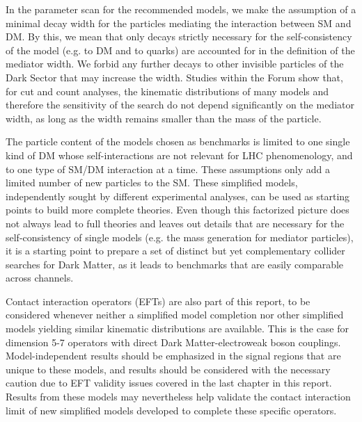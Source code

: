 In the parameter scan for the recommended models, we make the
assumption of a minimal decay width for the particles mediating the
interaction between SM and DM.  By this, we mean that only decays
strictly necessary for the self-consistency of the model (e.g.  to DM
and to quarks) are accounted for in the definition of the mediator
width. We forbid any further decays to other invisible particles of
the Dark Sector that may increase the width. Studies within the Forum
show that, for cut and count analyses, the kinematic distributions of
many models and therefore the sensitivity of the search do not depend
significantly on the mediator width, as long as the width remains smaller
than the mass of the particle.


The particle content of the models chosen as benchmarks is limited to
one single kind of DM whose self-interactions are not relevant for LHC
phenomenology, and to one type of SM/DM interaction at a time. These
assumptions only add a limited number of new particles to the
SM. These simplified models, independently sought by different
experimental analyses, can be used as starting points to build more
complete theories. Even though this factorized picture does not always
lead to full theories and leaves out details that are necessary for
the self-consistency of single models (e.g. the mass generation for
mediator particles), it is a starting point to prepare a set of
distinct but yet complementary collider searches for Dark Matter, as
it leads to benchmarks that are easily comparable across channels.

Contact interaction operators (EFTs) are also part of this report, 
to be considered whenever neither a simplified model completion 
nor other simplified models 
yielding similar kinematic distributions are available. 
This is the case for dimension 5-7 operators with direct 
Dark Matter-electroweak boson couplings. 
Model-independent results should be emphasized 
in the signal regions that are unique to these models, 
and results should be considered with the necessary caution due to EFT 
validity issues covered in the last chapter in this report. 
Results from these models may nevertheless help validate the 
contact interaction limit of new simplified models developed to complete 
these specific operators. 

